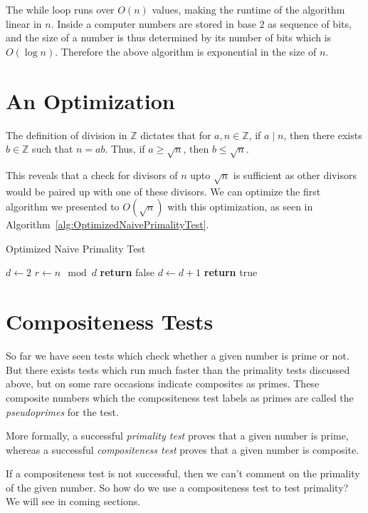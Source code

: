 \documentclass[11pt]{article}
\begin{document}
The while loop runs over $O(n)$ values, making the runtime of the algorithm linear in $n$. Inside a computer numbers are stored in base $2$ as sequence of bits, and the size of a number is thus determined by its number of bits which is $O(\log n)$. Therefore the above algorithm is exponential in the size of $n$.

\section{An Optimization}
The definition of division in $\mathbb{Z}$ dictates that for $a, n \in \mathbb{Z}$, if $a \mid n$, then there exists $b \in \mathbb{Z}$ such that $n = ab$. Thus, if $a \geq \sqrt n$, then $b \leq \sqrt n$. 

 This reveals that a check for divisors of $n$ upto $\sqrt n$ is sufficient as other divisors would be paired up with one of these divisors. We can optimize the first algorithm we presented to $O(\sqrt n)$ with this optimization, as seen in Algorithm~\ref{alg:OptimizedNaivePrimalityTest}.
 
\begin{algorithm}
\caption{Optimized Naive Primality Test}
\label{alg:OptimizedNaivePrimalityTest}
\begin{algorithmic}
\State $d\gets 2$
\State $r\gets n \mod d$
	\State \textbf{return} false 
\EndIf
\State $d \gets d+1$
\EndWhile
\State \textbf{return} true 
\EndProcedure
\end{algorithmic}
\end{algorithm}

\section{Compositeness Tests}
So far we have seen tests which check whether a given number is prime or not. But there exists tests which run much faster than the primality tests discussed above, but on some rare occasions indicate composites as primes. These composite numbers which the compositeness test labels as primes are called the \emph{pseudoprimes} for the test.

More formally, a successful \emph{primality test} proves that a given number is prime, whereas a successful \emph{compositeness test} proves that a given number is composite. 

If a compositeness test is not successful, then we can't comment on the primality of the given number. So how do we use a compositeness test to test primality? We will see in coming sections.
\end{document}
